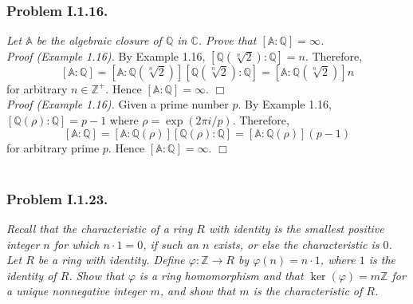 \documentclass{article}
\begin{document}



\subsubsection*{Problem I.1.16.}
\emph{Let $\mathbb{A}$ be the algebraic closure of $\mathbb{Q}$ in $\mathbb{C}$.
Prove that $[\mathbb{A}:\mathbb{Q}] = \infty$. } \\

\emph{Proof (Example 1.16).}
By Example 1.16, $[\mathbb{Q}(\sqrt[n]{2}):\mathbb{Q}] = n.$
Therefore,
$$[\mathbb{A}:\mathbb{Q}]
= [\mathbb{A}:\mathbb{Q}(\sqrt[n]{2})][\mathbb{Q}(\sqrt[n]{2}):\mathbb{Q}]
= [\mathbb{A}:\mathbb{Q}(\sqrt[n]{2})]n$$
for arbitrary $n \in \mathbb{Z}^+$.
Hence $[\mathbb{A}:\mathbb{Q}] = \infty$.
$\Box$ \\

\emph{Proof (Example 1.16).}
Given a prime number $p$.
By Example 1.16, $[\mathbb{Q}(\rho):\mathbb{Q}] = p-1$
where $\rho = \exp(2\pi i/p)$.
Therefore,
$$[\mathbb{A}:\mathbb{Q}]
= [\mathbb{A}:\mathbb{Q}(\rho)][\mathbb{Q}(\rho):\mathbb{Q}]
= [\mathbb{A}:\mathbb{Q}(\rho)](p-1)$$
for arbitrary prime $p$.
Hence $[\mathbb{A}:\mathbb{Q}] = \infty$.
$\Box$ \\\\






\subsubsection*{Problem I.1.23.}
\emph{Recall that the characteristic of a ring $R$ with identity
is the smallest positive integer $n$ for which $n \cdot 1 = 0$,
if such an $n$ exists, or else the characteristic is $0$.
Let $R$ be a ring with identity.
Define $\varphi: \mathbb{Z} \rightarrow R$ by $\varphi(n) = n \cdot 1$,
where $1$ is the identity of $R$.
Show that $\varphi$ is a ring homomorphism
and that $\ker(\varphi) = m\mathbb{Z}$ for a unique nonnegative integer $m$,
and show that $m$ is the characteristic of $R$.} \\
\end{document}
